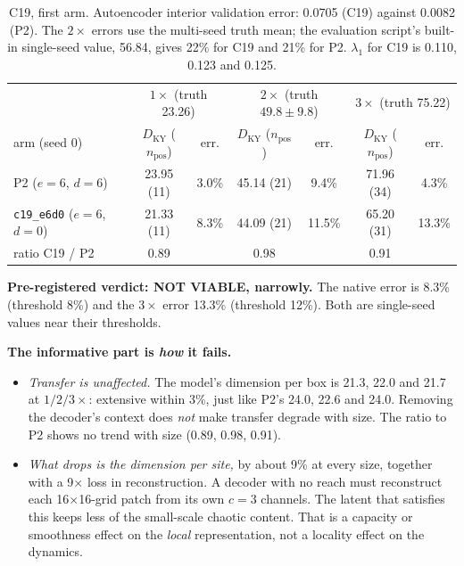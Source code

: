 \documentclass[11pt]{article}
\begin{document}
\begin{table}[h]
\centering
\small
\begin{tabular}{lcccccc}
\toprule
 & \multicolumn{2}{c}{$1\times$ (truth 23.26)} & \multicolumn{2}{c}{$2\times$ (truth $49.8\pm9.8$)} & \multicolumn{2}{c}{$3\times$ (truth 75.22)} \\
arm (seed 0) & $D_{\mathrm{KY}}$ ($n_{\mathrm{pos}}$) & err. & $D_{\mathrm{KY}}$ ($n_{\mathrm{pos}}$) & err. & $D_{\mathrm{KY}}$ ($n_{\mathrm{pos}}$) & err. \\
\midrule
P2 ($e{=}6$, $d{=}6$) & 23.95 (11) & 3.0\% & 45.14 (21) & 9.4\% & 71.96 (34) & 4.3\% \\
\texttt{c19\_e6d0} ($e{=}6$, $d{=}0$) & 21.33 (11) & 8.3\% & 44.09 (21) & 11.5\% & 65.20 (31) & 13.3\% \\
\midrule
ratio C19 / P2 & 0.89 & & 0.98 & & 0.91 & \\
\bottomrule
\end{tabular}
\caption{C19, first arm. Autoencoder interior validation error: 0.0705
(C19) against 0.0082 (P2). The $2\times$ errors use the multi-seed truth
mean; the evaluation script's built-in single-seed value, 56.84, gives
22\% for C19 and 21\% for P2. $\lambda_1$ for C19 is 0.110, 0.123 and
0.125.}
\label{tab:c19}
\end{table}

\textbf{Pre-registered verdict: NOT VIABLE, narrowly.} The native
error is 8.3\% (threshold 8\%) and the $3\times$ error 13.3\% (threshold
12\%). Both are single-seed values near their thresholds.

\textbf{The informative part is \emph{how} it fails.}
\begin{itemize}[leftmargin=*]
\item \emph{Transfer is unaffected.} The model's dimension per box is
  21.3, 22.0 and 21.7 at $1/2/3\times$: extensive within 3\%, just like
  P2's 24.0, 22.6 and 24.0. Removing the decoder's context does
  \emph{not} make transfer degrade with size. The ratio to P2 shows no
  trend with size (0.89, 0.98, 0.91).
\item \emph{What drops is the dimension per site,} by about 9\% at every
  size, together with a 9$\times$ loss in reconstruction. A decoder with
  no reach must reconstruct each 16$\times$16-grid patch from its own
  $c{=}3$ channels. The latent that satisfies this keeps less of the
  small-scale chaotic content. That is a capacity or smoothness effect
  on the \emph{local} representation, not a locality effect on the
  dynamics.
\end{itemize}
\end{document}
